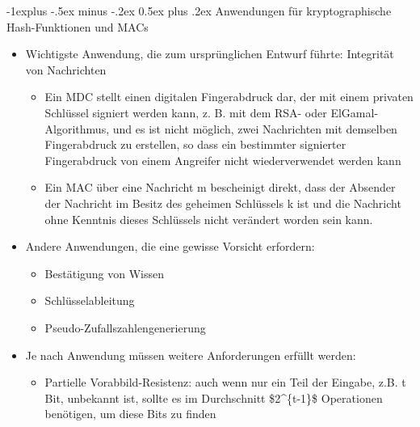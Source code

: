 \documentclass[a4paper]{article}
\makeatletter
\renewcommand{\subsection}{\@startsection{subsection}{2}{0mm}%
 {-1explus -.5ex minus -.2ex}%
 {0.5ex plus .2ex}%
 {\normalfont\normalsize\bfseries}}
\makeatother
\begin{document}
\begin{multicols}{3}
    \subsection{Anwendungen für kryptographische Hash-Funktionen und
        MACs}

    \begin{itemize}
        \item
              Wichtigste Anwendung, die zum ursprünglichen Entwurf führte:
              Integrität von Nachrichten

              \begin{itemize}
                  \item
                        Ein MDC stellt einen digitalen Fingerabdruck dar, der mit einem
                        privaten Schlüssel signiert werden kann, z. B. mit dem RSA- oder
                        ElGamal-Algorithmus, und es ist nicht möglich, zwei Nachrichten mit
                        demselben Fingerabdruck zu erstellen, so dass ein bestimmter
                        signierter Fingerabdruck von einem Angreifer nicht wiederverwendet
                        werden kann
                  \item
                        Ein MAC über eine Nachricht m bescheinigt direkt, dass der Absender
                        der Nachricht im Besitz des geheimen Schlüssels k ist und die
                        Nachricht ohne Kenntnis dieses Schlüssels nicht verändert worden
                        sein kann.
              \end{itemize}
        \item
              Andere Anwendungen, die eine gewisse Vorsicht erfordern:

              \begin{itemize}
                  \item
                        Bestätigung von Wissen
                  \item
                        Schlüsselableitung
                  \item
                        Pseudo-Zufallszahlengenerierung
              \end{itemize}
        \item
              Je nach Anwendung müssen weitere Anforderungen erfüllt werden:

              \begin{itemize}
                  \item
                        Partielle Vorabbild-Resistenz: auch wenn nur ein Teil der Eingabe,
                        z.B. t Bit, unbekannt ist, sollte es im Durchschnitt
                        \$2\^{}\{t-1\}\$ Operationen benötigen, um diese Bits zu finden
              \end{itemize}
    \end{itemize}



\end{multicols}
\end{document}
